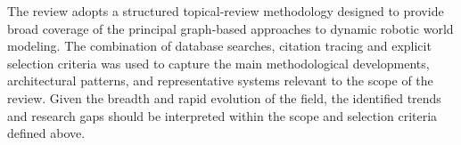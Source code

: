 The review adopts a structured topical-review methodology designed to provide broad coverage of the principal graph-based approaches to dynamic robotic world modeling.
The combination of database searches, citation tracing and explicit selection criteria was used to capture the main methodological developments, architectural patterns, and representative systems relevant to the scope of the review.
Given the breadth and rapid evolution of the field, the identified trends and research gaps should be interpreted within the scope and selection criteria defined above.
